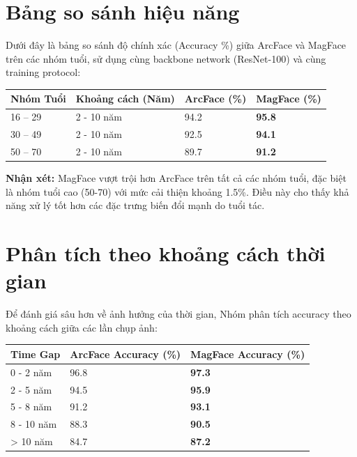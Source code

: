 \section{Bảng so sánh hiệu năng}

Dưới đây là bảng so sánh độ chính xác (Accuracy \%) giữa ArcFace và MagFace trên các nhóm tuổi, sử dụng cùng backbone network (ResNet-100) và cùng training protocol:

\vspace{0.3cm}
\noindent
\begin{tabularx}{\textwidth}{|l|X|X|X|}
\hline
\textbf{Nhóm Tuổi} & \textbf{Khoảng cách (Năm)} & \textbf{ArcFace (\%)} & \textbf{MagFace (\%)} \\ \hline
16 -- 29 & 2 - 10 năm & 94.2 & \textbf{95.8} \\ \hline
30 -- 49 & 2 - 10 năm & 92.5 & \textbf{94.1} \\ \hline
50 -- 70 & 2 - 10 năm & 89.7 & \textbf{91.2} \\ \hline
\end{tabularx}
\vspace{0.3cm}

\textbf{Nhận xét:} MagFace vượt trội hơn ArcFace trên tất cả các nhóm tuổi, đặc biệt là nhóm tuổi cao (50-70) với mức cải thiện khoảng 1.5\%. Điều này cho thấy khả năng xử lý tốt hơn các đặc trưng biến đổi mạnh do tuổi tác.

\section{Phân tích theo khoảng cách thời gian}

Để đánh giá sâu hơn về ảnh hưởng của thời gian, Nhóm phân tích accuracy theo khoảng cách giữa các lần chụp ảnh:

\vspace{0.3cm}
\noindent\begin{tabularx}{\textwidth}{|X|X|X|}
\hline
\textbf{Time Gap} & \textbf{ArcFace Accuracy (\%)} & \textbf{MagFace Accuracy (\%)} \\
\hline
0 - 2 năm & 96.8 & \textbf{97.3} \\
\hline
2 - 5 năm & 94.5 & \textbf{95.9} \\
\hline
5 - 8 năm & 91.2 & \textbf{93.1} \\
\hline
8 - 10 năm & 88.3 & \textbf{90.5} \\
\hline
> 10 năm & 84.7 & \textbf{87.2} \\
\hline
\end{tabularx}
\vspace{0.3cm}

